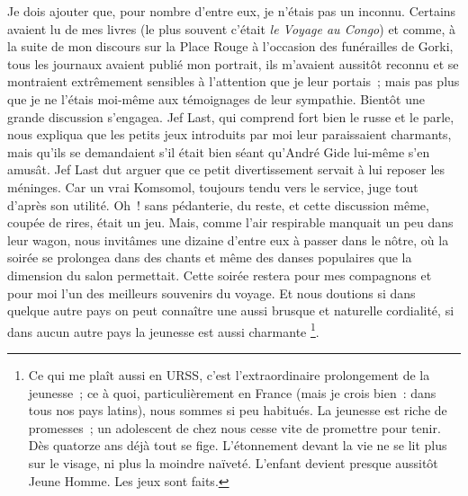 \documentclass[french,twoside]{book} %
\begin{document}
Je dois ajouter que, pour nombre d’entre eux, je n’étais pas un inconnu. Certains avaient lu de mes livres (le plus souvent c’était \emph{le Voyage au Congo}) et comme, à la suite de mon discours sur la Place Rouge à l’occasion des funérailles de Gorki, tous les journaux avaient publié mon portrait, ils m’avaient aussitôt reconnu et se montraient extrêmement sensibles à l’attention que je leur portais ; mais pas plus que je ne l’étais moi-même aux témoignages de leur sympathie. Bientôt une grande discussion s’engagea. Jef Last, qui comprend fort bien le russe et le parle, nous expliqua que les petits jeux introduits par moi leur paraissaient charmants, mais qu’ils se demandaient s’il était bien séant qu’André Gide lui-même s’en amusât. Jef Last dut arguer que ce petit divertissement servait à lui reposer les méninges. Car un vrai Komsomol, toujours tendu vers le service, juge tout d’après son utilité. Oh ! sans pédanterie, du reste, et cette discussion même, coupée de rires, était un jeu. Mais, comme l’air respirable manquait un peu dans leur wagon, nous invitâmes une dizaine d’entre eux à passer dans le nôtre, où la soirée se prolongea dans des chants et même des danses populaires que la dimension du salon permettait. Cette soirée restera pour mes compagnons et pour moi l’un des meilleurs souvenirs du voyage. Et nous doutions si dans quelque autre pays on peut connaître une aussi brusque et naturelle cordialité, si dans aucun autre pays la jeunesse est aussi charmante \footnote{Ce qui me plaît aussi en URSS, c’est l’extraordinaire prolongement de la jeunesse ; ce à quoi, particulièrement en France (mais je crois bien : dans tous nos pays latins), nous sommes si peu habitués. La jeunesse est riche de promesses ; un adolescent de chez nous cesse vite de promettre pour tenir. Dès quatorze ans déjà tout se fige. L’étonnement devant la vie ne se lit plus sur le visage, ni plus la moindre naïveté. L’enfant devient presque aussitôt Jeune Homme. Les jeux sont faits.}.\par
\end{document}
